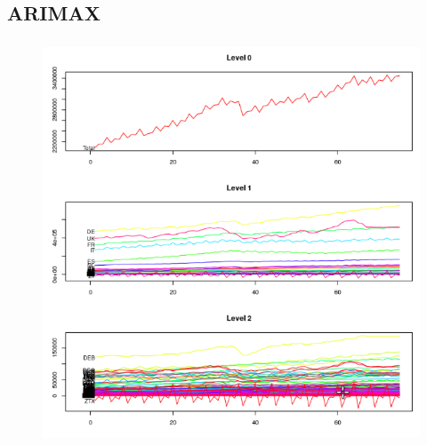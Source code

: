 \documentclass[c, dvipsnames]{beamer}  %
\begin{document}
\subsection{ARIMAX}


\begin{frame}[shrink=5]
\frametitle{\insertsection} 
\framesubtitle{\insertsubsection}


\begin{figure}
	\centering
	\includegraphics[width=0.7\linewidth]{screenshot038}
	\label{fig:screenshot029}
\end{figure}


\end{frame}
\end{document}
